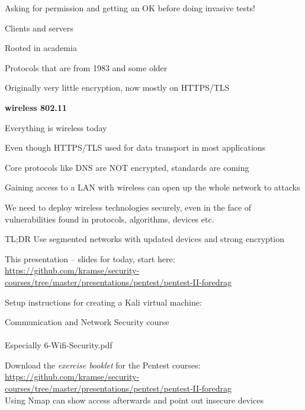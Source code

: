\documentclass[Screen16to9,17pt]{foils}
\begin{document}
Asking for permission and getting an OK before doing invasive tests!




\begin{list1}
\item Clients and servers
\item Rooted in academia
\item Protocols that are from 1983 and some older
\item Originally very little encryption, now mostly on HTTPS/TLS
\end{list1}



\centerline{\color{titlecolor}\LARGE\bf wireless 802.11}

\begin{list2}
\item Everything is wireless today
\item Even though HTTPS/TLS used for data transport in most applications
\item Core protocols like DNS are NOT encrypted, standards are coming
\item Gaining access to a LAN with wireless can open up the whole network to attacks
\item We need to deploy wireless technologies securely, even in the face of vulnerabilities found in protocols, algorithms, devices etc.
\end{list2}

TL;DR Use segmented networks with updated devices and strong encryption




\begin{list2}
\item This presentation -- slides for today, start here:\\
\url{https://github.com/kramse/security-courses/tree/master/presentations/pentest/pentest-II-foredrag}
\item Setup instructions for creating a Kali virtual machine:\\
\item Communication and Network Security course\\{\footnotesize
{}}\\
Especially 6-Wifi-Security.pdf
\item Download the \emph{exercise booklet} for the Pentest courses:\\
\url{https://github.com/kramse/security-courses/tree/master/presentations/pentest/pentest-II-foredrag}\\
Using Nmap can show access afterwards and point out insecure devices
\end{list2}
\end{document}

